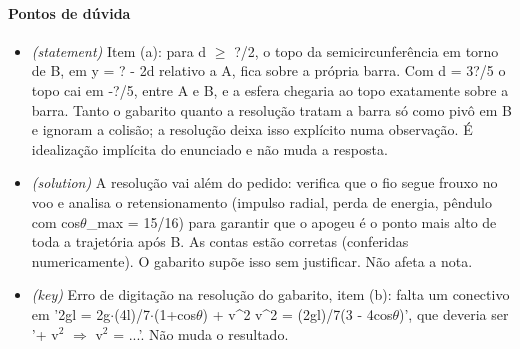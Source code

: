 \documentclass{article}%
\begin{document}
\paragraph{Pontos de dúvida}%
\begin{itemize}%
\item%
\textit{(statement)} Item (a): para d $\geq$ ?/2, o topo da semicircunferência em torno de B, em y = ? - 2d relativo a A, fica sobre a própria barra. Com d = 3?/5 o topo cai em -?/5, entre A e B, e a esfera chegaria ao topo exatamente sobre a barra. Tanto o gabarito quanto a resolução tratam a barra só como pivô em B e ignoram a colisão; a resolução deixa isso explícito numa observação. É idealização implícita do enunciado e não muda a resposta.%
\item%
\textit{(solution)} A resolução vai além do pedido: verifica que o fio segue frouxo no voo e analisa o retensionamento (impulso radial, perda de energia, pêndulo com cos$\theta$\_max = 15/16) para garantir que o apogeu é o ponto mais alto de toda a trajetória após B. As contas estão corretas (conferidas numericamente). O gabarito supõe isso sem justificar. Não afeta a nota.%
\item%
\textit{(key)} Erro de digitação na resolução do gabarito, item (b): falta um conectivo em '2gl = 2g$\cdot$(4l)/7$\cdot$(1+cos$\theta$) + v\^{}2 v\^{}2 = (2gl)/7(3 - 4cos$\theta$)', que deveria ser '+ v$^2$ $\Rightarrow$ v$^2$ = ...'. Não muda o resultado.%
\end{itemize}%
\end{document}
